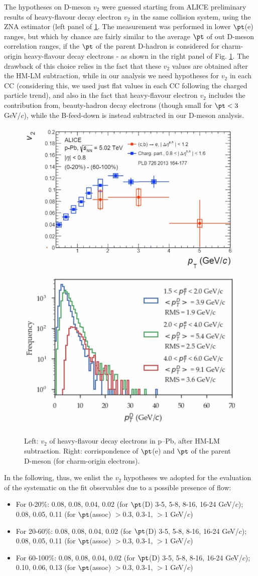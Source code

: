 The hypotheses on D-meson $v_2$ were guessed starting from ALICE preliminary results of heavy-flavour decay electron $v_2$ in the same collision system, using the ZNA estimator (left panel of \ref{fig:v2D}. The measurement was performed in lower $\pt$(e) ranges, but which by chance are fairly similar to the average $\pt$ of out D-meson correlation ranges, if the $\pt$ of the parent D-hadron is considered for charm-origin heavy-flavour decay electrons - as shown in the right panel of Fig. \ref{fig:v2D}. The drawback of this choice relies in the fact that these $v_2$ values are obtained after the HM-LM subtraction, while in our analysis we need hypotheses for $v_2$ in each CC (considering this, we used just flat values in each CC following the charged particle trend), and also in the fact that heavy-flavour electron $v_2$ includes the contribution from, beauty-hadron decay electrons (though small for $\pt < 3$ GeV/$c$), while the B-feed-down is instead subtracted in our D-meson analysis.

\begin{figure}
\centering
{\includegraphics[width=0.4\linewidth]{figuresVsCent/Global/v2/v2D1.jpg}}
{\includegraphics[width=0.4\linewidth]{figuresVsCent/Global/v2/v2D2.jpg}}
 \caption{Left: $v_2$ of heavy-flavour decay electrons in p--Pb, after HM-LM subtraction. Right: corrispondence of $\pt$(e) and $\pt$ of the parent D-meson (for charm-origin electrons).}
\label{fig:v2D}
\end{figure}

In the following, thus, we enlist the $v_2$ hypotheses we adopted for the evaluation of the systematic on the fit observables due to a possible presence of flow:
\begin{itemize}
  \item For 0-20\%: 0.08, 0.08, 0.04, 0.02 (for $\pt$(D) 3-5, 5-8, 8-16, 16-24 GeV/$c$); 0.08, 0.05, 0.11 (for $\pt$(assoc) $>0.3$, 0.3-1, $>1$ GeV/$c$)
  \item For 20-60\%: 0.08, 0.08, 0.04, 0.02 (for $\pt$(D) 3-5, 5-8, 8-16, 16-24 GeV/$c$); 0.08, 0.05, 0.11 (for $\pt$(assoc) $>0.3$, 0.3-1, $>1$ GeV/$c$)
  \item For 60-100\%: 0.08, 0.08, 0.04, 0.02 (for $\pt$(D) 3-5, 5-8, 8-16, 16-24 GeV/$c$); 0.10, 0.06, 0.13 (for $\pt$(assoc) $>0.3$, 0.3-1, $>1$ GeV/$c$)
\end{itemize}

